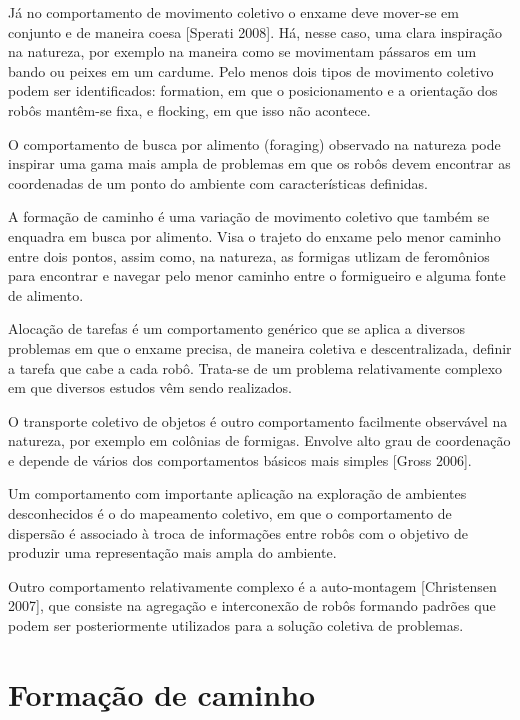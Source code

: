 Já no comportamento de movimento coletivo o enxame deve mover-se em conjunto e de
maneira coesa [Sperati 2008]. Há, nesse caso, uma clara inspiração na natureza, por exemplo na
maneira como se movimentam pássaros em um bando ou peixes em um cardume. Pelo menos
dois tipos de movimento coletivo podem ser identificados: formation, em que o posicionamento e a
orientação dos robôs mantêm-se fixa, e flocking, em que isso não acontece.

O comportamento de busca por alimento (foraging) observado na natureza pode inspirar
uma gama mais ampla de problemas em que os robôs devem encontrar as coordenadas de um
ponto do ambiente com características definidas.

A formação de caminho é uma variação de movimento coletivo que também se enquadra em busca por alimento. Visa o trajeto do enxame pelo menor caminho entre dois pontos, assim como, na natureza, as formigas utlizam de feromônios para encontrar e navegar pelo menor caminho entre o formigueiro e alguma fonte de alimento.

Alocação de tarefas é um comportamento genérico que se aplica a diversos problemas em
que o enxame precisa, de maneira coletiva e descentralizada, definir a tarefa que cabe a cada
robô. Trata-se de um problema relativamente complexo em que diversos estudos vêm sendo
realizados.

O transporte coletivo de objetos é outro comportamento facilmente observável na natureza,
por exemplo em colônias de formigas. Envolve alto grau de coordenação e depende de vários
dos comportamentos básicos mais simples [Gross 2006].

Um comportamento com importante aplicação na exploração de ambientes desconhecidos
é o do mapeamento coletivo, em que o comportamento de dispersão é associado à troca de
informações entre robôs com o objetivo de produzir uma representação mais ampla do ambiente.

Outro comportamento relativamente complexo é a auto-montagem [Christensen 2007], que
consiste na agregação e interconexão de robôs formando padrões que podem ser posteriormente
utilizados para a solução coletiva de problemas.

\section{Formação de caminho}



